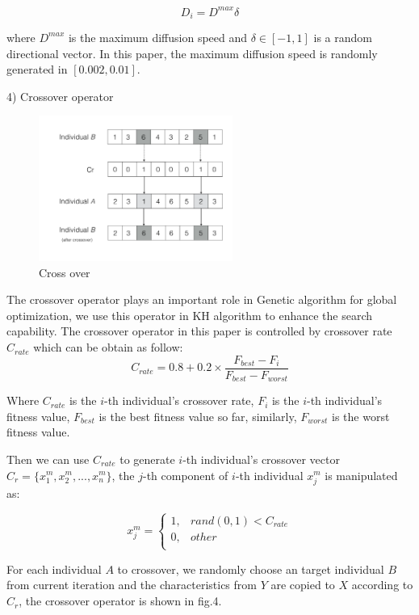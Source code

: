 \documentclass[10pt,journal,compsoc]{IEEEtran}
\begin{document}
\begin{equation}
D_i = D^{max}\delta
\end{equation}

where $D^{max}$ is the maximum diffusion speed and $\delta \in [-1, 1]$ is a random directional vector. In this paper, the maximum diffusion speed is randomly generated in $[0.002, 0.01]$. 

4) Crossover operator

\begin{figure}[!t]
\centering
\includegraphics[width=2.5in]{./img/pic4.pdf}
\caption{Cross over}
\label{fig_opportunistic}
\end{figure}


The crossover operator plays an important role in Genetic algorithm for global optimization, we use this operator in KH algorithm to enhance the search capability. The crossover operator in this paper is controlled by crossover rate $C_{rate}$ which can be obtain as follow:
\begin{equation}
C_{rate} = 0.8 + 0.2 \times \frac{F_{best}-F_{i}}{F_{best}-F_{worst}}
\end{equation}

Where $C_{rate}$ is the $i$-th individual's crossover rate, $F_{i}$ is the $i$-th individual's fitness value, $F_{best}$ is the best fitness value so far, similarly, $F_{worst}$ is the worst fitness value.

Then we can use $C_{rate}$ to generate $i$-th individual's crossover vector $C_r = \{x_{1}^m,x_{2}^m,...,x_{n}^m\}$, the $j$-th component of $i$-th individual $x_{j}^{m}$ is manipulated as:

\begin{equation}
x_{j}^m=
\begin{cases}
1,& rand(0,1) < C_{rate}\\
0,& other\\
\end{cases}
\end{equation}

For each individual $A$ to crossover, we randomly choose an target individual $B$ from current iteration and the characteristics from $Y$ are copied to $X$ according to $C_r$, the crossover operator is shown in fig.4.
\end{document}
